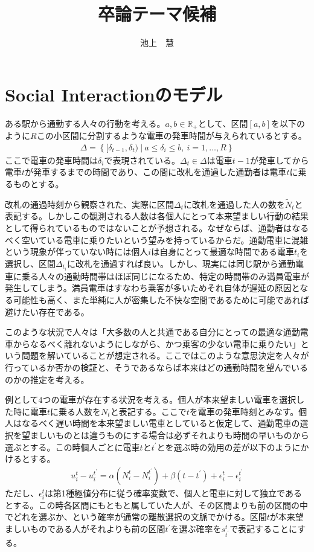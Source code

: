 \documentclass{jsarticle}
\begin{document}
\title{卒論テーマ候補 }
\author{池上　慧}
\maketitle

\section{Social Interactionのモデル}
ある駅から通勤する人々の行動を考える。$a,b\in \mathbb{R}_{+}$として、区間$[a, b]$を以下のように$R$この小区間に分割するような電車の発車時間が与えられているとする。
\begin{align*}
	\Delta = \left\{ [\delta_{t-1}, \delta_t)\ |\ a \leq \delta_i \leq b,\ i = 1, \dots, R \right\}
\end{align*}
ここで電車の発車時間は$\delta_i$で表現されている。$\Delta_t \in \Delta$は電車$t-1$が発車してから電車$t$が発車するまでの時間であり、この間に改札を通過した通勤者は電車$t$に乗るものとする。

改札の通過時刻から観察された、実際に区間$\Delta_t$に改札を通過した人の数を$\tilde{N}_t$と表記する。しかしこの観測される人数は各個人にとって本来望ましい行動の結果として得られているものではないことが予想される。なぜならば、通勤者はなるべく空いている電車に乗りたいという望みを持っているからだ。通勤電車に混雑という現象が伴っていない時には個人$i$は自身にとって最適な時間である電車$t_i$を選択し、区間$\Delta_{t_i}$に改札を通過すれば良い。しかし、現実には同じ駅から通勤電車に乗る人々の通勤時間帯はほぼ同じになるため、特定の時間帯のみ満員電車が発生してしまう。満員電車はすなわち乗客が多いためそれ自体が遅延の原因となる可能性も高く、また単純に人が密集した不快な空間であるために可能であれば避けたい存在である。

このような状況で人々は「大多数の人と共通である自分にとっての最適な通勤電車からなるべく離れないようにしながら、かつ乗客の少ない電車に乗りたい」という問題を解いていることが想定される。ここではこのような意思決定を人々が行っているか否かの検証と、そうであるならば本来はどの通勤時間を望んでいるのかの推定を考える。

例として$4$つの電車が存在する状況を考える。個人が本来望ましい電車を選択した時に電車$t$に乗る人数を$N_t$と表記する。ここで$t$を電車の発車時刻とみなす。個人はなるべく遅い時間を本来望ましい電車としていると仮定して、通勤電車の選択を望ましいものとは違うものにする場合は必ずそれよりも時間の早いものから選ぶとする。この時個人ごとに電車$t$と$t^{'}$とを選ぶ時の効用の差が以下のようにかけるとする。
\begin{align*}
	u_i^t - u_i^{t^{'}} = \alpha(N_i^t - N_i^{t^{'}}) + \beta(t - t^{'}) + \epsilon_i^t - \epsilon_i^{t^{'}}
\end{align*}
ただし、$\epsilon_i^t$は第1種極値分布に従う確率変数で、個人と電車に対して独立であるとする。この時各区間にもともと属していた人が、その区間よりも前の区間の中でどれを選ぶか、という確率が通常の離散選択の文脈でかける。区間$t$が本来望ましいものである人がそれよりも前の区間$t^{'}$を選ぶ確率を$s_{t^{'}}^t$で表記することにする。
\end{document}
